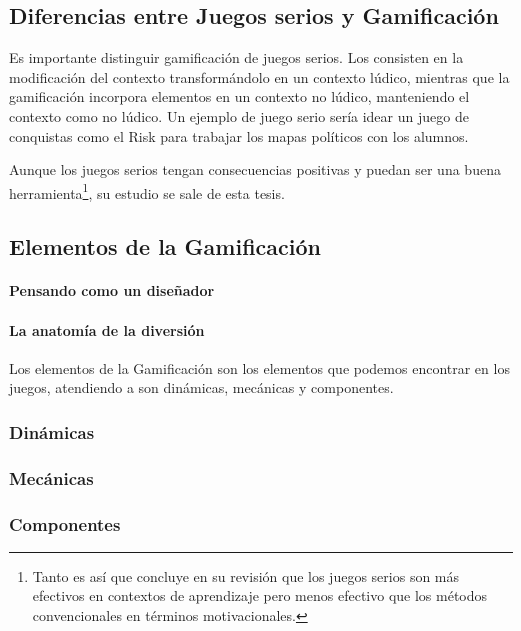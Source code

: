 \subsection{Diferencias entre Juegos serios y Gamificación}

Es importante distinguir gamificación de juegos serios. Los  consisten en la modificación del contexto transformándolo en un contexto lúdico, mientras que la gamificación incorpora elementos en un contexto no lúdico, manteniendo el contexto como no lúdico.
%
Un ejemplo de juego serio sería idear un juego de conquistas como el Risk para trabajar los mapas políticos con los alumnos. 

Aunque los juegos serios tengan consecuencias positivas y puedan ser una buena herramienta\footnote{Tanto es así que \cite{MetaSerious} concluye en su revisión que los juegos serios son más efectivos en contextos de aprendizaje pero menos efectivo que los métodos convencionales en términos motivacionales.}, su estudio se sale de esta tesis.

\subsection{Elementos de la Gamificación}

\paragraph{Pensando como un diseñador}

\paragraph{La anatomía de la diversión}

Los elementos de la Gamificación son los elementos que podemos encontrar en los juegos, atendiendo a \cite{Hunicke04mda:a} son dinámicas, mecánicas y componentes.

\subsubsection{Dinámicas}

\subsubsection{Mecánicas}

\subsubsection{Componentes}



